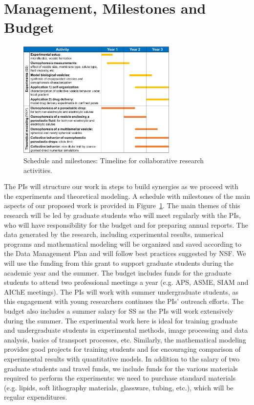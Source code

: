 \documentclass[11pt]{article}
\begin{document}
\section{Management, Milestones and Budget}
\vspace*{-7pt}
\begin{figure}
\vspace*{-15pt}
\centerline{\includegraphics[width=3.1in]{figs/timeline.pdf}}
\vspace*{-8pt}
\caption{\footnotesize Schedule and milestones: Timeline for collaborative research activities.}
\label{fig:ScheduleMilestones}
\end{figure}
%
The PIs will structure our work in steps to build synergies as we
proceed with the experiments and theoretical modeling. A schedule with
milestones of the main aspects of our proposed work is provided in
Figure~\ref{fig:ScheduleMilestones}. The main themes of this research
will be led by graduate students who will meet regularly with the PIs,
who will have responsibility for the budget and for preparing annual
reports. The data generated by the research, including experimental
results, numerical programs and mathematical modeling will be organized
and saved according to the Data Management Plan and will follow best
practices suggested by NSF. We will use the funding from this grant to
support graduate students during the academic year and the summer. The
budget includes funds for the graduate students to attend two
professional meetings a year (e.g. APS, ASME, SIAM and AIChE meetings).
The PIs will work with summer undergraduate students, as this engagement
with young researchers continues the PIs' outreach efforts. The budget
also includes a summer salary for SS as the PIs will work extensively
during the summer. The experimental work here is ideal for training
graduate and undergraduate students in experimental methods, image
processing and data analysis, basics of transport processes, etc.
Similarly, the mathematical modeling provides good projects for training
students and for encouraging comparison of experimental results with
quantitative models. In addition to the salary of two graduate students
and travel funds, we include funds for the various materials required to
perform the experiments: we need to purchase standard materials (e.g.
lipids, soft lithography materials, glassware, tubing, etc.), which will
be regular expenditures.
\end{document}
